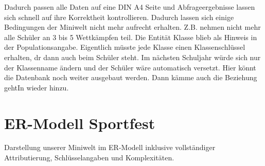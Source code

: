 \documentclass[pagesize,11pt,twoside]{scrartcl}
\begin{document}
Dadurch passen alle Daten auf eine DIN A4 Seite und Abfrageergebnisse lassen sich schnell 
auf ihre Korrektheit kontrollieren.
Dadurch lassen sich einige Bedingungen der Miniwelt nicht mehr aufrecht erhalten.
Z.B. nehmen nicht mehr alle Schüler an 3 bis 5 Wettkämpfen teil.
Die Entität Klasse blieb als Hinweis in der Populationsangabe. Eigentlich müsste jede Klasse
einen Klassenschlüssel erhalten, dr dann auch beim Schüler steht. Im nächsten Schuljahr würde sich nur der
Klassenname ändern und der Schüler wäre automatisch versetzt. Hier könnt die Datenbank noch weiter 
ausgebaut werden. Dann kämme auch die Beziehung gehtIn wieder hinzu.



\newpage
\section{ER-Modell Sportfest}
Darstellung unserer Miniwelt im ER-Modell inklusive vollständiger Attributierung, Schlüsselangaben und 
Komplexitäten.
\end{document}
